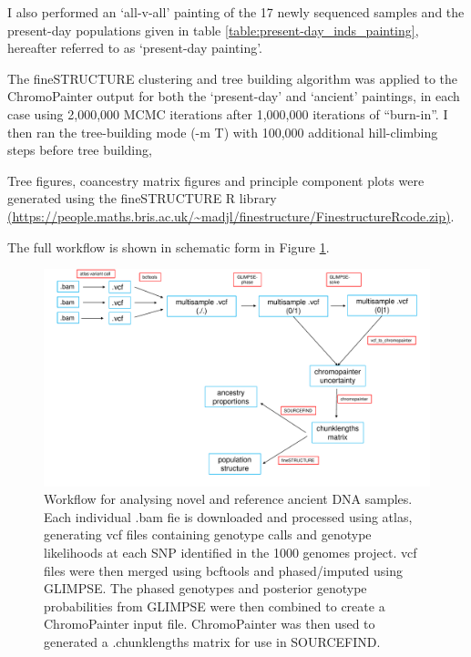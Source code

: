 I also performed an `all-v-all' painting of the 17 newly sequenced samples and the present-day populations given in table \ref{table:present-day_inds_painting}, hereafter referred to as `present-day painting'.


The fineSTRUCTURE \cite{Lawson2012} clustering and tree building algorithm was applied to the ChromoPainter output for both the `present-day' and `ancient' paintings, in each case using 2,000,000 MCMC iterations after 1,000,000 iterations of ``burn-in''. I then ran the tree-building mode (-m T) with 100,000 additional hill-climbing steps before tree building,

Tree figures, coancestry matrix figures and principle component plots were generated using the fineSTRUCTURE R library \url{(https://people.maths.bris.ac.uk/~madjl/finestructure/FinestructureRcode.zip)}.

The full workflow is shown in schematic form in Figure \ref{fig:workflow_slav}.

\begin{figure}[htp]
    \centering
    \includegraphics[width=1.0\textwidth]{../images/chapter4/workflow.pdf}
    \caption{Workflow for analysing novel and reference ancient DNA samples. Each individual .bam fie is downloaded and processed using atlas, generating vcf files containing genotype calls and genotype likelihoods at each SNP identified in the 1000 genomes project. vcf files were then merged using bcftools and phased/imputed using GLIMPSE. The phased genotypes and posterior genotype probabilities from GLIMPSE were then combined to create a ChromoPainter input file. ChromoPainter was then used to generated a .chunklengths matrix for use in SOURCEFIND.}
    \label{fig:workflow_slav}
\end{figure}


